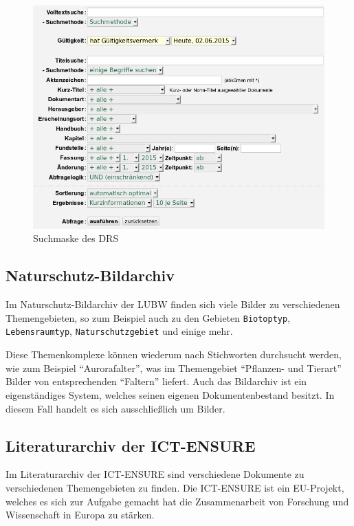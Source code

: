 \begin{figure}[!ht]
\centering
\includegraphics[width=15cm]{Bilder/Suchmaske_DRS.jpg}
\caption{Suchmaske des \ac{DRS}}
\label{Suchmaske DRS}
\centering
\end{figure}

\subsection{Naturschutz-Bildarchiv} \label{Bilddatenbank}
Im Naturschutz-Bildarchiv der \ac{LUBW} finden sich viele Bilder zu verschiedenen Themengebieten, so zum Beispiel auch zu den Gebieten \texttt{Biotoptyp}, \texttt{Lebensraumtyp}, \texttt{Naturschutzgebiet} und einige mehr.
\cite{Naturschutz-Bildarchiv}

Diese Themenkomplexe k\"onnen wiederum nach Stichworten durchsucht werden, wie zum Beispiel "`Aurorafalter"', was im Themengebiet "`Pflanzen- und Tierart"' Bilder von entsprechenden "`Faltern"' liefert. Auch das Bildarchiv ist ein eigenst\"andiges System, welches seinen eigenen Dokumentenbestand besitzt. In diesem Fall handelt es sich ausschlie\ss{}lich um Bilder.

\subsection{Literaturarchiv der ICT-ENSURE}
Im Literaturarchiv der \ac{ICT-ENSURE} sind verschiedene Dokumente zu verschiedenen Themengebieten zu finden. Die \ac{ICT-ENSURE} ist ein EU-Projekt, welches es sich zur Aufgabe gemacht hat die Zusammenarbeit von Forschung und Wissenschaft in Europa zu st\"arken.

